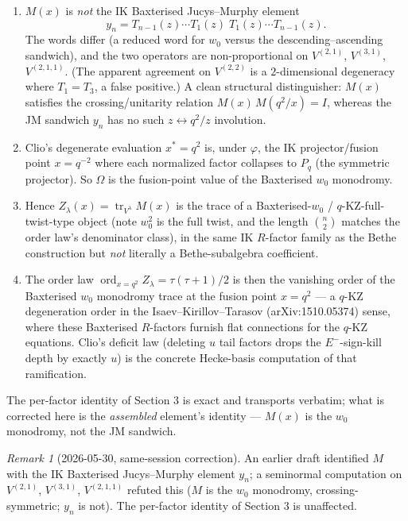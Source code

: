 \documentclass{article}
\theoremstyle{remark}
\newtheorem{remark}{Remark}
\newcommand{\ord}{\operatorname{ord}}
\newcommand{\tr}{\operatorname{tr}}
\begin{document}
\begin{enumerate}
  \item[(i)] $M(x)$ is \emph{not} the IK Baxterised Jucys--Murphy element
  \[
    y_n = T_{n-1}(z) \cdots T_1(z)\; T_1(z) \cdots T_{n-1}(z).
  \]
  The words differ (a reduced word for $w_0$ versus the descending--ascending sandwich), and the two operators are non-proportional on $V^{(2,1)}$, $V^{(3,1)}$, $V^{(2,1,1)}$. (The apparent agreement on $V^{(2,2)}$ is a $2$-dimensional degeneracy where $T_1 = T_3$, a false positive.) A clean structural distinguisher: $M(x)$ satisfies the crossing/unitarity relation $M(x)\, M(q^2/x) = I$, whereas the JM sandwich $y_n$ has no such $z \leftrightarrow q^2/z$ involution.

  \item[(ii)] Clio's degenerate evaluation $x^* = q^2$ is, under $\varphi$, the IK projector/fusion point $x = q^{-2}$ where each normalized factor collapses to $P_q$ (the symmetric projector). So $\Omega$ is the fusion-point value of the Baxterised $w_0$ monodromy.

  \item[(iii)] Hence $Z_\lambda(x) = \tr_{V^\lambda} M(x)$ is the trace of a Baxterised-$w_0$ / $q$-KZ-full-twist-type object (note $w_0^2$ is the full twist, and the length $\binom{n}{2}$ matches the order law's denominator class), in the same IK $R$-factor family as the Bethe construction but \emph{not} literally a Bethe-subalgebra coefficient.

  \item[(iv)] The order law $\ord_{x=q^2} Z_\lambda = \tau(\tau+1)/2$ is then the vanishing order of the Baxterised $w_0$ monodromy trace at the fusion point $x = q^2$ --- a $q$-KZ degeneration order in the Isaev--Kirillov--Tarasov (arXiv:1510.05374) sense, where these Baxterised $R$-factors furnish flat connections for the $q$-KZ equations. Clio's deficit law (deleting $u$ tail factors drops the $E^-$-sign-kill depth by exactly $u$) is the concrete Hecke-basis computation of that ramification.
\end{enumerate}

The per-factor identity of Section 3 is exact and transports verbatim; what is corrected here is the \emph{assembled} element's identity --- $M(x)$ is the $w_0$ monodromy, not the JM sandwich.

\begin{remark}[2026-05-30, same-session correction]
An earlier draft identified $M$ with the IK Baxterised Jucys--Murphy element $y_n$; a seminormal computation on $V^{(2,1)}$, $V^{(3,1)}$, $V^{(2,1,1)}$ refuted this ($M$ is the $w_0$ monodromy, crossing-symmetric; $y_n$ is not). The per-factor identity of Section 3 is unaffected.
\end{remark}
\end{document}

